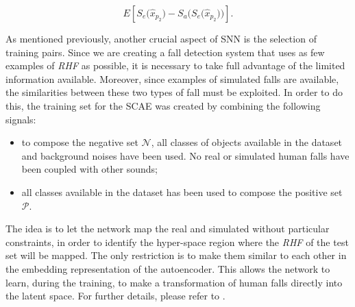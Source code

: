 \begin{equation}
E [ S_e \big(\hat{x}_{p_2}\big) -  S_a \big(S_e \big(\hat{x}_{p_2}\big)\big)].
\end{equation}

As mentioned previously, another crucial aspect of SNN is the selection of training pairs.
Since we are creating a fall detection system that uses as few examples of \textit{RHF} as possible, it is necessary to take full advantage of the limited information available. Moreover, since examples of simulated falls are available, the similarities between these two types of fall must be exploited. In order to do this, the training set for the SCAE was created by combining the following signals:
\begin{itemize}
	\item to compose the negative set $\mathcal{N}$, all classes of objects available in the dataset and background noises have been used. No real or simulated human falls have been coupled with other sounds;
	\item all classes available in the dataset has been used to compose the positive set $\mathcal{P}$.
\end{itemize}
The idea is to let the network map the real and simulated without particular constraints, in order to identify the hyper-space region where the \textit{RHF} of the test set will be mapped. The only restriction is to make them similar to each other in the embedding representation of the autoencoder. This allows the network to learn, during the training, to make a transformation of human falls directly into the latent space. For further details, please refer to .

